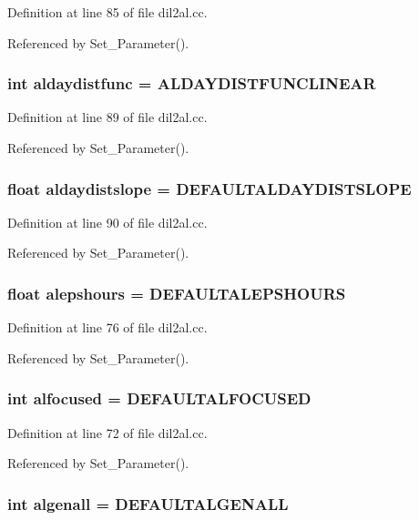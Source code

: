 Definition at line 85 of file dil2al.cc.

Referenced by Set\_\-Parameter().
\subsubsection{\setlength{\rightskip}{0pt plus 5cm}int aldaydistfunc = ALDAYDISTFUNCLINEAR}\label{dil2al_8cc_a71}




Definition at line 89 of file dil2al.cc.

Referenced by Set\_\-Parameter().
\subsubsection{\setlength{\rightskip}{0pt plus 5cm}float aldaydistslope = DEFAULTALDAYDISTSLOPE}\label{dil2al_8cc_a72}




Definition at line 90 of file dil2al.cc.

Referenced by Set\_\-Parameter().
\subsubsection{\setlength{\rightskip}{0pt plus 5cm}float alepshours = DEFAULTALEPSHOURS}\label{dil2al_8cc_a58}




Definition at line 76 of file dil2al.cc.

Referenced by Set\_\-Parameter().
\subsubsection{\setlength{\rightskip}{0pt plus 5cm}int alfocused = DEFAULTALFOCUSED}\label{dil2al_8cc_a54}




Definition at line 72 of file dil2al.cc.

Referenced by Set\_\-Parameter().
\subsubsection{\setlength{\rightskip}{0pt plus 5cm}int algenall = DEFAULTALGENALL}\label{dil2al_8cc_a57}





